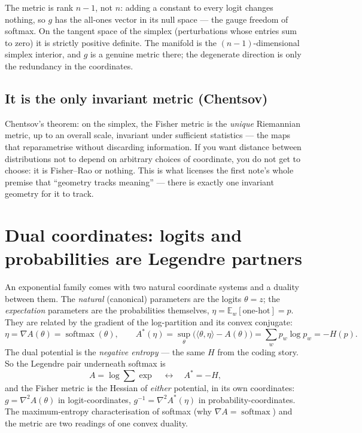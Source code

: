 \documentclass[11pt]{article}
\begin{document}
\begin{insight}
The metric is rank $n-1$, not $n$: adding a constant to every logit changes nothing, so
$g$ has the all-ones vector in its null space --- the gauge freedom of softmax. On the tangent
space of the simplex (perturbations whose entries sum to zero) it is strictly positive
definite. The manifold is the $(n-1)$-dimensional simplex interior, and $g$ is a genuine metric
there; the degenerate direction is only the redundancy in the coordinates.
\end{insight}

\subsection*{It is the only invariant metric (Chentsov)}

Chentsov's theorem: on the simplex, the Fisher metric is the \emph{unique} Riemannian metric,
up to an overall scale, invariant under sufficient statistics --- the maps that reparametrise
without discarding information. If you want distance between distributions not to depend on
arbitrary choices of coordinate, you do not get to choose: it is Fisher--Rao or nothing. This
is what licenses the first note's whole premise that ``geometry tracks meaning'' --- there is
exactly one invariant geometry for it to track.

\section{Dual coordinates: logits and probabilities are Legendre partners}

An exponential family comes with two natural coordinate systems and a duality between them.
The \emph{natural} (canonical) parameters are the logits $\theta = z$; the \emph{expectation}
parameters are the probabilities themselves, $\eta = \mathbb{E}_w[\text{one-hot}] = p$. They are
related by the gradient of the log-partition and its convex conjugate:
\[
  \eta = \nabla A(\theta) = \operatorname{softmax}(\theta),
  \qquad
  A^{*}(\eta) = \sup_\theta\bigl(\langle\theta,\eta\rangle - A(\theta)\bigr)
  = \sum_w p_w \log p_w = -H(p).
\]
The dual potential is the \emph{negative entropy} --- the same $H$ from the coding story. So
the Legendre pair underneath softmax is
\[
  A = \log\textstyle\sum\exp \quad\longleftrightarrow\quad A^{*} = -H,
\]
and the Fisher metric is the Hessian of \emph{either} potential, in its own coordinates:
$g = \nabla^2 A(\theta)$ in logit-coordinates, $g^{-1} = \nabla^2 A^{*}(\eta)$ in
probability-coordinates. The maximum-entropy characterisation of softmax (why $\nabla A =
\operatorname{softmax}$) and the metric are two readings of one convex duality.
\end{document}
